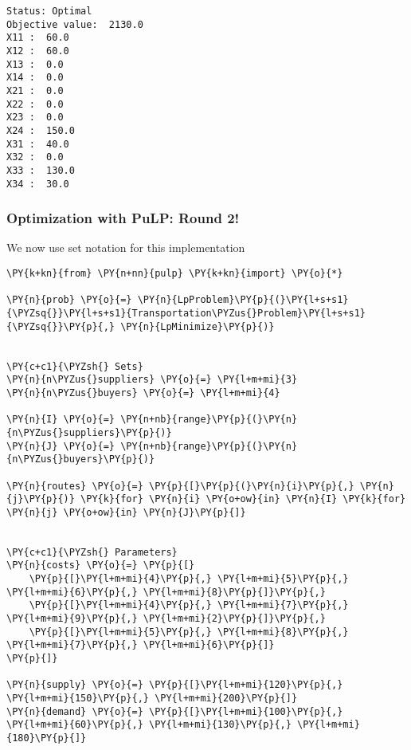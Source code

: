     \begin{Verbatim}[commandchars=\\\{\}]
Status: Optimal
Objective value:  2130.0
X11 :  60.0
X12 :  60.0
X13 :  0.0
X14 :  0.0
X21 :  0.0
X22 :  0.0
X23 :  0.0
X24 :  150.0
X31 :  40.0
X32 :  0.0
X33 :  130.0
X34 :  30.0
    \end{Verbatim}

    \hypertarget{optimization-with-pulp-round-2}{%
\subsubsection{Optimization with PuLP: Round
2!}\label{optimization-with-pulp-round-2}}

We now use set notation for this implementation

    \begin{tcolorbox}[breakable, size=fbox, boxrule=1pt, pad at break*=1mm,colback=cellbackground, colframe=cellborder]
\begin{Verbatim}[commandchars=\\\{\}]
\PY{k+kn}{from} \PY{n+nn}{pulp} \PY{k+kn}{import} \PY{o}{*}

\PY{n}{prob} \PY{o}{=} \PY{n}{LpProblem}\PY{p}{(}\PY{l+s+s1}{\PYZsq{}}\PY{l+s+s1}{Transportation\PYZus{}Problem}\PY{l+s+s1}{\PYZsq{}}\PY{p}{,} \PY{n}{LpMinimize}\PY{p}{)}


\PY{c+c1}{\PYZsh{} Sets}
\PY{n}{n\PYZus{}suppliers} \PY{o}{=} \PY{l+m+mi}{3}
\PY{n}{n\PYZus{}buyers} \PY{o}{=} \PY{l+m+mi}{4}

\PY{n}{I} \PY{o}{=} \PY{n+nb}{range}\PY{p}{(}\PY{n}{n\PYZus{}suppliers}\PY{p}{)}
\PY{n}{J} \PY{o}{=} \PY{n+nb}{range}\PY{p}{(}\PY{n}{n\PYZus{}buyers}\PY{p}{)}

\PY{n}{routes} \PY{o}{=} \PY{p}{[}\PY{p}{(}\PY{n}{i}\PY{p}{,} \PY{n}{j}\PY{p}{)} \PY{k}{for} \PY{n}{i} \PY{o+ow}{in} \PY{n}{I} \PY{k}{for} \PY{n}{j} \PY{o+ow}{in} \PY{n}{J}\PY{p}{]}


\PY{c+c1}{\PYZsh{} Parameters}
\PY{n}{costs} \PY{o}{=} \PY{p}{[}
    \PY{p}{[}\PY{l+m+mi}{4}\PY{p}{,} \PY{l+m+mi}{5}\PY{p}{,} \PY{l+m+mi}{6}\PY{p}{,} \PY{l+m+mi}{8}\PY{p}{]}\PY{p}{,}
    \PY{p}{[}\PY{l+m+mi}{4}\PY{p}{,} \PY{l+m+mi}{7}\PY{p}{,} \PY{l+m+mi}{9}\PY{p}{,} \PY{l+m+mi}{2}\PY{p}{]}\PY{p}{,} 
    \PY{p}{[}\PY{l+m+mi}{5}\PY{p}{,} \PY{l+m+mi}{8}\PY{p}{,} \PY{l+m+mi}{7}\PY{p}{,} \PY{l+m+mi}{6}\PY{p}{]}
\PY{p}{]}

\PY{n}{supply} \PY{o}{=} \PY{p}{[}\PY{l+m+mi}{120}\PY{p}{,} \PY{l+m+mi}{150}\PY{p}{,} \PY{l+m+mi}{200}\PY{p}{]}
\PY{n}{demand} \PY{o}{=} \PY{p}{[}\PY{l+m+mi}{100}\PY{p}{,} \PY{l+m+mi}{60}\PY{p}{,} \PY{l+m+mi}{130}\PY{p}{,} \PY{l+m+mi}{180}\PY{p}{]}




\end{Verbatim}
\end{tcolorbox}

